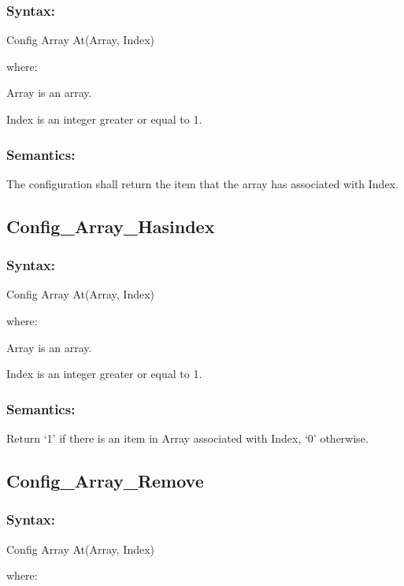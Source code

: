 \subsubsection{Syntax:}\label{syntax-13}

Config Array At(Array, Index)

where:

Array is an array.

Index is an integer greater or equal to 1.

\subsubsection{Semantics:}\label{semantics-14}

The configuration shall return the item that the array has associated
with Index.

\subsection{Config\_Array\_Hasindex}\label{config_array_hasindex}

\subsubsection{Syntax:}\label{syntax-14}

Config Array At(Array, Index)

where:

Array is an array.

Index is an integer greater or equal to 1.

\subsubsection{Semantics:}\label{semantics-15}

Return `1' if there is an item in Array associated with Index, `0'
otherwise.

\subsection{Config\_Array\_Remove}\label{config_array_remove}

\subsubsection{Syntax:}\label{syntax-15}

Config Array At(Array, Index)

where:

